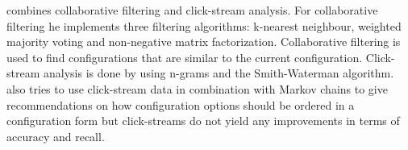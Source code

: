 \begin{description}[style=unboxed, leftmargin=0cm, font=\normalfont]
    \item[\citeauthor{wetzelPersonalisierterUndLernender2017} \cite{wetzelPersonalisierterUndLernender2017}] combines collaborative filtering and click-stream analysis. For collaborative filtering he implements three filtering algorithms: k-nearest neighbour, weighted majority voting and non-negative matrix factorization. Collaborative filtering is used to find configurations that are similar to the current configuration. Click-stream analysis is done by using n-grams and the Smith-Waterman algorithm. \citeauthor{wetzelPersonalisierterUndLernender2017} also tries to use click-stream data in combination with Markov chains to give recommendations on how configuration options should be ordered in a configuration form but click-streams do not yield any improvements in terms of accuracy and recall.
\end{description}

